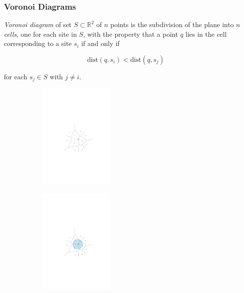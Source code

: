 \begin{frame} \frametitle{Voronoi Diagrams} \label{pg:definition}
\vspace{-0.24cm}

\begin{definition}
	\emph{Voronoi diagram} of set $S \subset \mathbb R^2$ of $n$ points is the subdivision
	of the plane into $n$ \emph{cells}, one for each site in $S$, with the property that
	a point $q$ lies in the cell corresponding to a site $s_i$ if and only if \vspace{-0.5cm}

	$$\mathrm{dist} (q, s_i) < \mathrm{dist} (q, s_j)$$ \vspace{-0.8cm}

	for each $s_j \in S$ with $j \ne i$.
\end{definition}

\begin{figure}[h] \centering
	\begin{subfigure}[t]{0.32\textwidth} \centering
		\includegraphics[width=3.7cm]{figs/voronoiDiagram}
	\end{subfigure} \quad
	\begin{subfigure}[t]{0.32\textwidth} \centering
		\includegraphics[width=3.7cm]{figs/voronoiCircle}
	\end{subfigure} \quad
\end{figure}

\end{frame}

